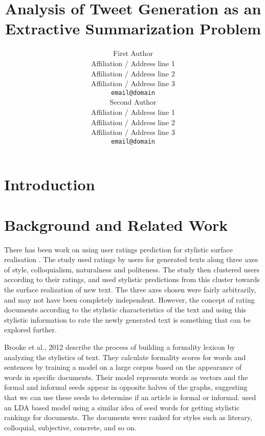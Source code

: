 \documentclass[11pt]{article}
\title{Analysis of Tweet Generation as an Extractive Summarization Problem}
\author{First Author \\
  Affiliation / Address line 1 \\
  Affiliation / Address line 2 \\
  Affiliation / Address line 3 \\
  {\tt email@domain} \\\And
  Second Author \\
  Affiliation / Address line 1 \\
  Affiliation / Address line 2 \\
  Affiliation / Address line 3 \\
  {\tt email@domain} \\}
\date{}
\begin{document}
\maketitle
\begin{abstract}
\end{abstract}


\section{Introduction}

\section{Background and Related Work}

There has been work on using user ratings prediction for stylistic surface realisation \cite{dethlefs2014cluster}. The study used ratings by users for generated texts along three axes of style, colloquialism, naturalness and politeness. The study then clustered users according to their ratings, and used stylistic predictions from this cluster towards the surface realization of new text. The three axes chosen were fairly arbitrarily, and may not have been completely independent. However, the concept of rating documents according to the stylistic characteristics of the text and using this stylistic information to rate the newly generated text is something that can be explored further. 

Brooke et al., 2012 \cite{brooke2012building} describe the process of building a formality lexicon by analyzing the stylistics of text. They calculate formality scores for words and sentences by training a model on a large corpus based on the appearance of words in specific documents. Their model represents words as vectors and the formal and informal seeds appear in opposite halves of the graphs, suggesting that we can use these seeds to determine if an article is formal or informal. \cite{brooke2013multi} used an LDA based model using a similar idea of seed words for getting stylistic rankings for documents. The documents were ranked for styles such as literary, colloquial, subjective, concrete, and so on. 
\end{document}
